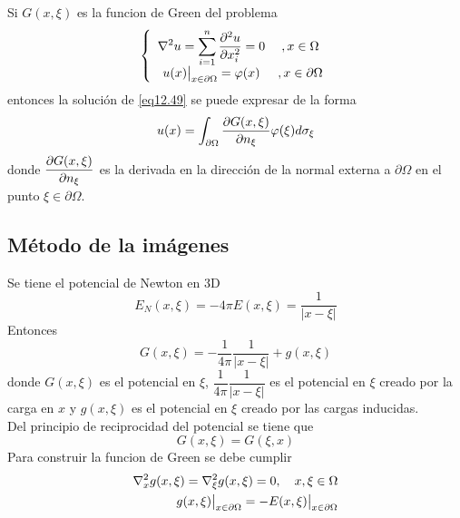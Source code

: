 \documentclass[../main]{subfiles}
\begin{document}
    \begin{teorema}
        Si $G(x,\xi)$ es la funcion de Green del problema
        \begin{equation}
        \begin{split}
            \left\{
            \begin{array}{cc}
              \displaystyle \nabla^2 u=\sum_{i=1}^n \pdv{^2 u}{x_i^2}=0   & , x \in \Omega \\
              \displaystyle u(x)\big{|}_{x \in \partial \Omega}=\varphi(x)   & , x \in \partial \Omega
            \end{array}
            \right.
        \end{split}
        \label{eq12.49}
    \end{equation}
    entonces la solución de \eqref{eq12.49} se puede expresar de la forma
    \begin{equation}
        u(x)=\int_{\partial \Omega} \pdv{G(x,\xi)}{n_{\xi}}\varphi(\xi) d\sigma_{\xi}
    \end{equation}
    donde $\displaystyle \pdv{G(x,\xi)}{n_{\xi}}$ es la derivada en la dirección de la normal externa a $\partial \Omega$ en el punto $\xi \in \partial \Omega$.
    \end{teorema}
    \subsection{Método de la imágenes}
    Se tiene el potencial de Newton en 3D
    \begin{equation}
        E_N (x,\xi)=-4\pi E(x,\xi)=\dfrac{1}{|x-\xi|}
    \end{equation}
    Entonces
    \begin{equation}
        G(x,\xi)=-\dfrac{1}{4\pi}\dfrac{1}{|x-\xi|}+g(x,\xi)
    \end{equation}
    donde $G(x,\xi)$ es el potencial en $\xi$, $\dfrac{1}{4\pi}\dfrac{1}{|x-\xi|}$ es el potencial en $\xi$ creado por la carga en $x$ y $g(x,\xi)$ es el potencial en $\xi$ creado por las cargas inducidas.\\[0.3cm]
    Del principio de reciprocidad del potencial se tiene que
    $$
    G(x,\xi)=G(\xi,x)
    $$
    Para construir la funcion de Green se debe cumplir
    \begin{align}
        \nabla^2_x g(x,\xi)=\nabla^2_{\xi} g(x,\xi)=0, \quad x,\xi \in \Omega \label{eq12.53}\\
        g(x,\xi)\big{|}_{x\in\partial\Omega}=-E(x,\xi)\big{|}_{x\in\partial\Omega} \label{eq12.54}
    \end{align}
\end{document}
